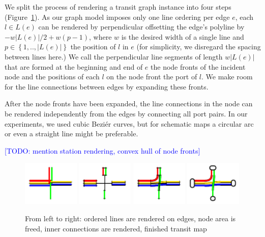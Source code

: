 \documentclass{llncs}
\newcommand\todo[1]{\textcolor{blue}{[TODO: #1]}}
\begin{document}
We split the process of rendering a transit graph instance into four steps (Figure~\ref{FIG:renderingproc}). As our graph model imposes only one line ordering per edge $e$, each $l \in L(e)$ can be rendered by perpendicular offsetting the edge's polyline by $-w\left|L(e)\right|/2 + w\left(p-1\right)$, where $w$ is the desired width of a single line and $p \in \left\{1, .. , \left|L(e)\right|\right\}$ the position of $l$ in $e$ (for simplicity, we disregard the spacing between lines here.) We call the perpendicular line segments of length $w\left|L(e)\right|$ that are formed at the beginning and end of $e$ the node fronts of the incident node and the positions of each $l$ on the node front the port of $l$. We make room for the line connections between edges by expanding these fronts.

After the node fronts have been expanded, the line connections in the node can be rendered independently from the edges by connecting all port pairs. In our experiments, we used cubic Bezi\'{e}r curves, but for schematic maps a circular arc or even a straight line might be preferable.

\todo{mention station rendering, convex hull of node fronts}

\begin{figure}[t]
  \centering
	\includegraphics[width=0.24\textwidth]{render_examples/rendering/render_example1.pdf}
	\hfill
    \includegraphics[width=0.24\textwidth]{render_examples/rendering/render_example2.pdf}
    \hfill
    \includegraphics[width=0.24\textwidth]{render_examples/rendering/render_example3.pdf}
    \hfill
    \includegraphics[width=0.24\textwidth]{render_examples/rendering/render_example4.pdf}
	\caption{From left to right: ordered lines are rendered on edges, node area is freed, inner connections are rendered, finished transit map}
	\label{FIG:renderingproc}
\end{figure}
\end{document}
